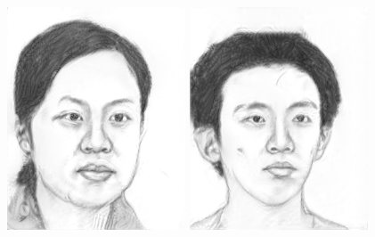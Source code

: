 \documentclass[10pt,twocolumn,letterpaper]{article}
\begin{document}
\begin{figure}[htbp]
{\begin{minipage}[b]{0.22\linewidth}
\includegraphics[width=0.99\linewidth]{img/light&pose_invariance/ours_p1.png}
\includegraphics[width=0.99\linewidth]{img/light&pose_invariance/ours_p2.png}

\end{minipage}}
\end{figure}
\end{document}
